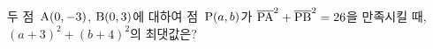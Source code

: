 두 점~$\mathrm{A}(0{,}\mkern3mu\mathopen{}-3)$, $\mathrm{B}(0{,}\mkern3mu\mathopen{}3)$에 대하여 점~$\mathrm{P}(a{,}\mkern3mu\mathopen{}b)$가 $\overline{\mathrm{PA}}^2+\overline{\mathrm{PB}}^2=26$을 만족시킬 때, $(a+3)^2+(b+4)^2$의 최댓값은?
